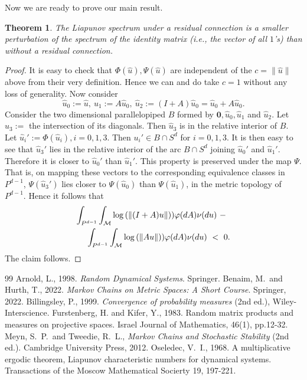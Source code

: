 \documentclass[10pt,a4paper]{amsart}
\newtheorem{theorem}{Theorem}[section]
\newcommand{\M}{\mathcal{M}}
\newcommand{\0}{\textbf{0}}
\newcommand{\HA}{\mathcal{H}}
\begin{document}
Now we are ready to prove our main result. \\


\begin{theorem}\label{final}  
The Liapunov spectrum under a residual connection is a smaller perturbation of the spectrum of the identity matrix (i.e., the vector of all $1$'s) than without a residual connection.
\end{theorem}

\begin{proof} It is easy to check that $\Phi(\hat{u}), \Psi(\hat{u})$ are independent of the $c = \|\hat{u}\|$ above from their very definition. Hence we can and do take $c = 1$ without any loss of generality. Now consider  
$$\hat{u}_0 := \hat{u}, \ \hat{u}_1 := A\hat{u}_0, \ \hat{u}_2 := (I + A)\hat{u}_0 = \hat{u}_0 + A\hat{u}_0.$$ 
Consider the two dimensional parallelopiped $B$ formed by $\0, \hat{u}_0, \hat{u}_1$ and $\hat{u}_2$. Let $\hat{u}_3:=$ the intersection of its diagonals. Then $\hat{u}_3$ is in the relative interior of $B$. Let $\hat{u}_i' := \Phi(\hat{u}_i), i = 0,1,3$. Then $u_i' \in B\cap S^d$ for $ i = 0,1,3$. It is then easy to see that $\hat{u}_3'$ lies in the relative interior of the arc $B\cap S^d$ joining $\hat{u}_0'$ and $\hat{u}_1'$. Therefore it is closer to $\hat{u}_0'$ than $\hat{u}_1'$. This property is  preserved under the map $\Psi$. That is, on mapping these vectors to the corresponding equivalence classes in $P^{d-1}$, $\Psi(\hat{u}_3')$ lies closer to $\Psi(\hat{u}_0)$ than $\Psi(\hat{u}_1)$, in the metric topology of $P^{d-1}$. 
Hence it follows that
\begin{eqnarray*}
\lefteqn{\int_{P^{d-1}}\int_\M \log\left(\|(I + A)u\|\right))\varphi(dA)\nu(du) \ -} \\
&& \  \int_{P^{d-1}}\int_\M \log\left(\|Au\|\right))\varphi(dA)\nu(du) \ < \ 0.
\end{eqnarray*}
The claim follows. \end{proof}


\begin{thebibliography}{99}
 Arnold, L., 1998. \textit{Random Dynamical Systems}. Springer.
 Benaim, M.\ and Hurth, T., 2022. \textit{Markov Chains on Metric Spaces: A Short Course}. Springer, 2022.
 Billingsley, P., 1999. \textit{Convergence of probability measures} (2nd ed.), Wiley-Interscience.
 Furstenberg, H. and Kifer, Y., 1983. Random matrix products and measures on projective spaces. Israel Journal of Mathematics, 46(1), pp.12-32.
 Meyn, S.\ P.\ and Tweedie, R.\ L., \textit{Markov Chains and Stochastic Stability} (2nd ed.). Cambridge University Press, 2012.
 Oseledec, V.\ I., 1968. A multiplicative ergodic theorem, Liapunov characteristic numbers for dynamical systems. Transactions of the Moscow Mathematical Socierty 19, 197-221.
\end{thebibliography}
\end{document}
